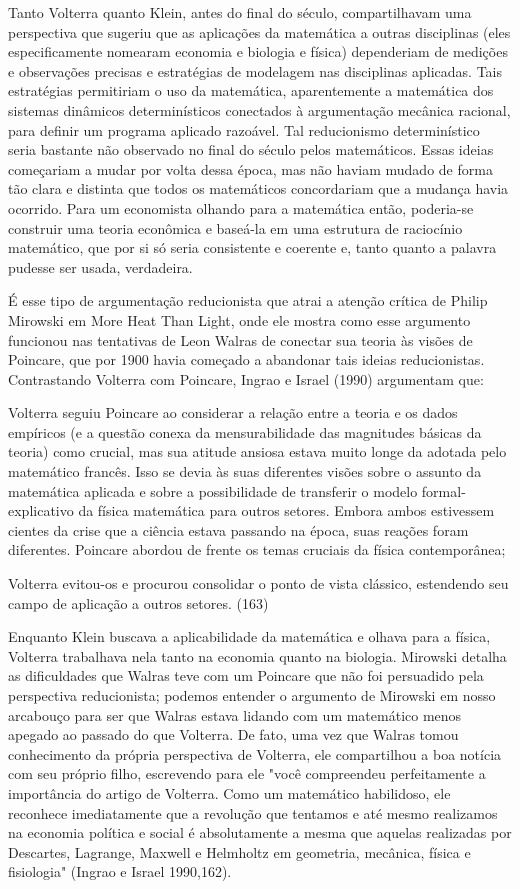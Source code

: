 \documentclass[12pt]{article}
\begin{document}
Tanto Volterra quanto Klein, antes do final do século, compartilhavam uma perspectiva que sugeriu que as aplicações da matemática a outras disciplinas (eles especificamente nomearam economia e biologia e física) dependeriam de medições e observações precisas e estratégias de modelagem nas disciplinas aplicadas. Tais estratégias permitiriam o uso da matemática, aparentemente a matemática dos sistemas dinâmicos determinísticos conectados à argumentação mecânica racional, para definir um programa aplicado razoável. Tal reducionismo determinístico seria bastante não observado no final do século pelos matemáticos. Essas ideias começariam a mudar por volta dessa época, mas não haviam mudado de forma tão clara e distinta que todos os matemáticos concordariam que a mudança havia ocorrido. Para um economista olhando para a matemática então, poderia-se construir uma teoria econômica e baseá-la em uma estrutura de raciocínio matemático, que por si só seria consistente e coerente e, tanto quanto a palavra pudesse ser usada, verdadeira.

É esse tipo de argumentação reducionista que atrai a atenção crítica de Philip Mirowski em More Heat Than Light, onde ele mostra como esse argumento funcionou nas tentativas de Leon Walras de conectar sua teoria às visões de Poincare, que por 1900 havia começado a abandonar tais ideias reducionistas. Contrastando Volterra com Poincare, Ingrao e Israel (1990) argumentam que:

Volterra seguiu Poincare ao considerar a relação entre a teoria e os dados empíricos (e a questão conexa da mensurabilidade das magnitudes básicas da teoria) como crucial, mas sua atitude ansiosa estava muito longe da adotada pelo matemático francês. Isso se devia às suas diferentes visões sobre o assunto da matemática aplicada e sobre a possibilidade de transferir o modelo formal-explicativo da física matemática para outros setores. Embora ambos estivessem cientes da crise que a ciência estava passando na época, suas reações foram diferentes. Poincare abordou de frente os temas cruciais da física contemporânea;

Volterra evitou-os e procurou consolidar o ponto de vista clássico, estendendo seu campo de aplicação a outros setores. (163)

Enquanto Klein buscava a aplicabilidade da matemática e olhava para a física, Volterra trabalhava nela tanto na economia quanto na biologia. Mirowski detalha as dificuldades que Walras teve com um Poincare que não foi persuadido pela perspectiva reducionista; podemos entender o argumento de Mirowski em nosso arcabouço para ser que Walras estava lidando com um matemático menos apegado ao passado do que Volterra. De fato, uma vez que Walras tomou conhecimento da própria perspectiva de Volterra, ele compartilhou a boa notícia com seu próprio filho, escrevendo para ele "você compreendeu perfeitamente a importância do artigo de Volterra. Como um matemático habilidoso, ele reconhece imediatamente que a revolução que tentamos e até mesmo realizamos na economia política e social é absolutamente a mesma que aquelas realizadas por Descartes, Lagrange, Maxwell e Helmholtz em geometria, mecânica, física e fisiologia" (Ingrao e Israel 1990,162).
\end{document}
